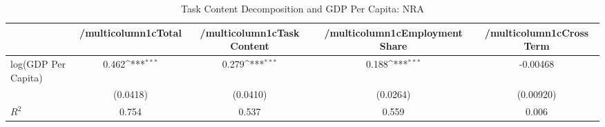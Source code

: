 \begin{table}[htbp]\centering
\def\sym#1{\ifmmode^{#1}\else\(^{#1}\)\fi}
\caption{Task Content Decomposition and GDP Per Capita: NRA}
\begin{tabular}{l*{4}{c}}
\hline\hline
            &/multicolumn{1}{c}{Total}&/multicolumn{1}{c}{Task Content}&/multicolumn{1}{c}{Employment Share}&/multicolumn{1}{c}{Cross Term}\\
\hline
log(GDP Per Capita)&       0.462\sym{***}&       0.279\sym{***}&       0.188\sym{***}&    -0.00468         \\
            &    (0.0418)         &    (0.0410)         &    (0.0264)         &   (0.00920)         \\

\(R^{2}\)   &       0.754         &       0.537         &       0.559         &       0.006         \\
\hline\hline
\end{tabular}
\end{table}
